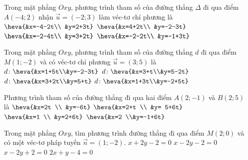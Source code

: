\begin{ex}%
	Trong mặt phẳng $Oxy$, phương  trình tham số của đường thẳng $\Delta$ đi qua điểm $A(-4; 2)$ nhận $\overrightarrow{u}=(-2; 3)$ làm véc-tơ chỉ phương là
	 \choice
		 {\True $\heva{&x=-4-2t\\ &y=2+3t}$}
		 {$\heva{&x=4+2t\\ &y=-2-3t}$}
		{$\heva{&x=-2-4t\\  &y=3+2t}$}
		{$\heva{&x=-2-2t\\  &y=-1+3t}$}
\end{ex}

\begin{ex}%
	Trong mặt phẳng $Oxy$, phương trình tham số của đường thẳng $d$  đi qua điểm $M(1;-2)$ và có véc-tơ chỉ phương $\overrightarrow{u}=(3;5)$ là
	\choice 
		{$d\colon\heva{&x=1+5t\\&y=-2-3t}$} 
		{$d\colon\heva{&x=3+t\\&y=5-2t}$} 
		 {$d\colon\heva{&x=3+2t\\&y=5+t}$}
		{\True $d\colon\heva{&x=1+3t\\&y=-2+5t}$} 
\end{ex}

\begin{ex}%
	Phương trình tham số của đường  thẳng đi qua hai điểm $A(2;-1)$ và $B(2;5)$ là
	\choice 
		{$\heva{&x=2t  \\ &y=-6t}$}
		{$\heva{&x=2+t \\ &y=  5+6t}$}
		{$\heva{&x=1 \\ &y=2+6t}$} 
		{\True  $\heva{&x=2 \\&y=-1+6t}$}
\end{ex}

\begin{ex}%
	Trong mặt phẳng  $O x y$, tìm phương trình đường thẳng đi qua điểm $M(2; 0)$ và có một véc-tơ pháp tuyến $\overrightarrow{n}=(1;-2)$.
	 \choice
		{$x+2 y-2=0$} 
		{\True $x-2 y-2=0$} 
		{$x-2 y+2=0$} 
		{$2  x+y-4=0$}
\end{ex}

